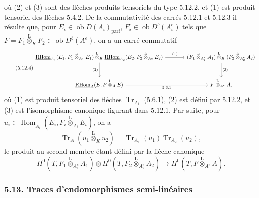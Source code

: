 \documentclass[11pt]{article}
\DeclareMathOperator{\Hom}{Hom}
\newcommand{\ob}{\operatorname{ob}}
\providecommand{\RHom}{\mathrm{RHom}}
\providecommand{\uRHom}{\underline{\RHom}}
\providecommand{\uHom}{\underline{\Hom}}
\providecommand{\Tr}{\operatorname{Tr}}
\providecommand{\Tr}{\operatorname{Tr}}
\providecommand{\lten}{\overset{\mathrm L}{\otimes}}
\providecommand{\Tr}{\operatorname{Tr}}
\providecommand{\RHom}{\mathrm{RHom}}
\providecommand{\Hom}{\operatorname{Hom}}
\providecommand{\ob}{\operatorname{ob}}
\providecommand{\lten}{\overset{\mathrm L}{\otimes}}
\providecommand{\RHom}{\mathrm R\mathcal{H}om}
\providecommand{\lten}{\overset{\mathrm L}{\otimes}}
\providecommand{\Tr}{\operatorname{Tr}}
\providecommand{\lten}{\overset{\mathrm L}{\otimes}}
\providecommand{\lten}{\overset{\mathrm L}{\otimes}}
\providecommand{\lten}{\overset{\mathrm L}{\otimes}}
\providecommand{\RHom}{\mathrm{RHom}}
\providecommand{\Hom}{\operatorname{Hom}}
\providecommand{\Tr}{\operatorname{Tr}}
\providecommand{\lten}{\overset{\mathrm L}{\otimes}}
\begin{document}
où (2) et (3) sont des flèches produits tensoriels du type 5.12.2, et (1) est produit tensoriel des flèches 5.4.2. De la commutativité des carrés 5.12.1 et 5.12.3 il résulte que, pour $E_i\in\ob D(A_i)_{\mathrm{parf}}$, $F_i\in\ob D^b(A_i^e)$ tels que $F=F_1\lten_KF_2\in\ob D^b(A^e)$, on a un carré commutatif
\begin{equation}\tag{5.12.4}
\begin{tikzcd}[column sep=large,row sep=large]
\uRHom_{A_1}(E_1,F_1\lten_{A_1}E_1)\lten_K\uRHom_{A_2}(E_2,F_2\lten_{A_2}E_2) \arrow[r,"(1)"] \arrow[d,"(2)"'] & (F_1\lten_{A_1^e}A_1)\lten_K(F_2\lten_{A_2^e}A_2) \arrow[d,"(3)"]\\
\uRHom_A(E,F\lten_AE) \arrow[r,"5.6.1"'] & F\lten_{A^e}A,
\end{tikzcd}
\end{equation}
où (1) est produit tensoriel des flèches $\Tr_{A_i}$ (5.6.1), (2) est défini par 5.12.2, et (3) est l'isomorphisme canonique figurant dans 5.12.1. Par suite, pour $u_i\in\uHom_{A_i}(E_i,F_i\lten_{A_i}E_i)$, on a
\begin{equation}\tag{5.12.5}
\Tr_A(u_1\lten_Ku_2)=\Tr_{A_1}(u_1)\Tr_{A_2}(u_2),
\end{equation}
le produit au second membre étant défini par la flèche canonique
\[
H^0(T,F_1\lten_{A_1^e}A_1)\otimes H^0(T,F_2\lten_{A_2^e}A_2)
\longrightarrow H^0(T,F\lten_{A^e}A).
\]

\subsubsection*{5.13. Traces d'endomorphismes semi-linéaires}
\end{document}
